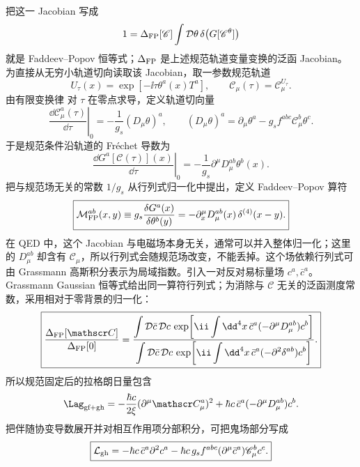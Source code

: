 把这一 Jacobian 写成
\begin{equation*}
 1=\Delta_{\rm FP}[\mathscr C]
 \int\mathcal D\theta\,
 \delta\!\left(G[\mathscr C^\theta]\right)
\end{equation*}
就是 Faddeev--Popov 恒等式；$\Delta_{\rm FP}$ 是上述规范轨道变量变换的泛函 Jacobian。为直接从无穷小轨道切向读取该 Jacobian，取一参数规范轨道
\begin{equation*}
 U_\tau(x)=\exp[-\ii\tau\theta^a(x)T^a],
 \qquad \mathscr C_\mu(\tau)=\mathscr C_\mu^{U_\tau}.
\end{equation*}
由有限变换律 对 $\tau$ 在零点求导，定义轨道切向量
\begin{equation*}
 \left.\frac{\dd\mathscr C_\mu^a(\tau)}{\dd\tau}\right|_0
 =-\frac1{g_s}(D_\mu\theta)^a,
 \qquad
 (D_\mu\theta)^a
 =\partial_\mu\theta^a-g_sf^{abc}\mathscr C_\mu^b\theta^c.
\end{equation*}
于是规范条件沿轨道的 Fr\'echet 导数为
\begin{equation*}
 \left.\frac{\dd G^a[\mathscr C(\tau)](x)}{\dd\tau}\right|_0
 =-\frac1{g_s}\partial^\mu D_\mu^{ab}\theta^b(x).
\end{equation*}
把与规范场无关的常数 $1/g_s$ 从行列式归一化中提出，定义 Faddeev--Popov 算符
\begin{equation}
 \boxed{
 \mathcal M_{\rm FP}^{ab}(x,y)
 \equiv
 g_s\frac{\delta G^a(x)}{\delta\theta^b(y)}
 =-\partial_x^\mu D_\mu^{ab}(x)\,\delta^{(4)}(x-y).}
 \label{eq:qcd-fp-operator-dp10}
\end{equation}
在 QED 中，这个 Jacobian 与电磁场本身无关，通常可以并入整体归一化；这里的 $D_\mu^{ab}$ 却含有 $\mathscr C_\mu$，所以行列式会随规范场改变，不能丢掉。这个场依赖行列式可由 Grassmann 高斯积分表示为局域指数。引入一对反对易标量场 $c^a,\bar c^a$。Grassmann Gaussian 恒等式给出同一算符行列式；为消除与 $\mathscr C$ 无关的泛函测度常数，采用相对于零背景的归一化：
\begin{equation*}
 \boxed{
 \frac{\Delta_{\rm FP}[\mathscr C]}{\Delta_{\rm FP}[0]}
 =
 \frac{
 \displaystyle\int\mathcal D\bar c\,\mathcal Dc\,
 \exp\!\left[
 \ii\int\dd^4x\,\bar c^a(-\partial^\mu D_\mu^{ab})c^b
 \right]}
 {
 \displaystyle\int\mathcal D\bar c\,\mathcal Dc\,
 \exp\!\left[
 \ii\int\dd^4x\,\bar c^a(-\partial^2\delta^{ab})c^b
 \right]}.}
\end{equation*}
所以规范固定后的拉格朗日量包含
\begin{equation}
 \Lag_{\rm gf+gh}
 =-\frac{\hbar c}{2\xi}(\partial^\mu\mathscr C_\mu^a)^2
 +\hbar c\,\bar c^a(-\partial^\mu D_\mu^{ab})c^b.
 \label{eq:qcd-gauge-fixing-ghost-lagrangian-dp10}
\end{equation}
把伴随协变导数展开并对相互作用项分部积分，可把鬼场部分写成
\begin{equation}
\boxed{
\mathcal L_{\rm gh}
=-\hbar c\,\bar c^a\partial^2c^a
-\hbar c\,g_sf^{abc}(\partial^\mu\bar c^a)\mathscr C_\mu^b c^c.}
\label{eq:qcd-ghost-expanded-dp68}
\end{equation}

